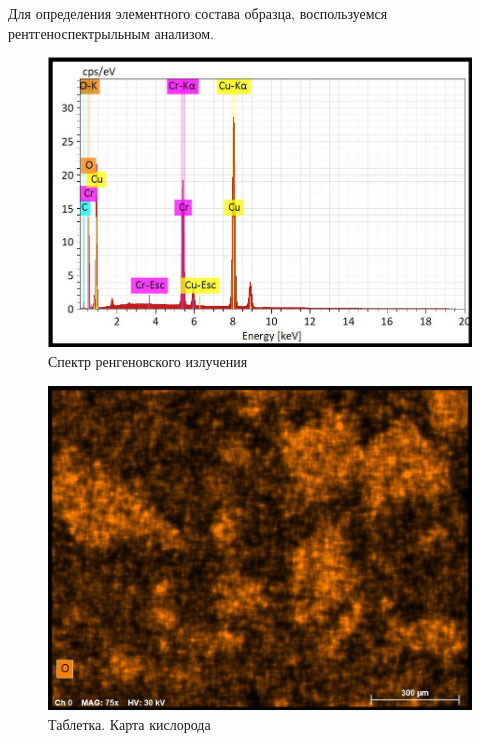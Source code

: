 \documentclass[a4paper,12pt]{article}
\theoremstyle{plain} %
\theoremstyle{definition} %
\theoremstyle{remark} %
\begin{document}
Для определения элементного состава образца, воспользуемся рентгеноспектрыльным анализом. 

\begin{figure}[h!]
	\centering
	\includegraphics[scale=0.6]{pic9.jpg}
	\caption{Спектр ренгеновского излучения}
	\label{pic9}
\end{figure} 
\begin{figure}[h!]
	\centering
	\includegraphics[scale=0.6]{pic10.jpg}
	\caption{Таблетка. Карта кислорода}
	\label{pic10}
\end{figure}
\end{document}
